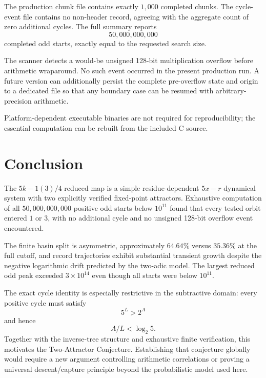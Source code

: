 \documentclass[11pt]{article}
\begin{document}
The production chunk file contains exactly $1,000$ completed chunks. The cycle-event file contains no non-header record, agreeing with the aggregate count of zero additional cycles. The full summary reports
\[
50,000,000,000
\]
completed odd starts, exactly equal to the requested search size.

The scanner detects a would-be unsigned 128-bit multiplication overflow before arithmetic wraparound. No such event occurred in the present production run. A future version can additionally persist the complete pre-overflow state and origin to a dedicated file so that any boundary case can be resumed with arbitrary-precision arithmetic.

Platform-dependent executable binaries are not required for reproducibility; the essential computation can be rebuilt from the included C source.

\section{Conclusion}

The $5k-1(3)/4$ reduced map is a simple residue-dependent $5x-r$ dynamical system with two explicitly verified fixed-point attractors. Exhaustive computation of all $50,000,000,000$ positive odd starts below $10^{11}$ found that every tested orbit entered $1$ or $3$, with no additional cycle and no unsigned 128-bit overflow event encountered.

The finite basin split is asymmetric, approximately $64.64\%$ versus $35.36\%$ at the full cutoff, and record trajectories exhibit substantial transient growth despite the negative logarithmic drift predicted by the two-adic model. The largest reduced odd peak exceeded $3\times10^{14}$ even though all starts were below $10^{11}$.

The exact cycle identity is especially restrictive in the subtractive domain: every positive cycle must satisfy
\[
5^L>2^A
\]
and hence
\[
A/L<\log_2 5.
\]
Together with the inverse-tree structure and exhaustive finite verification, this motivates the Two-Attractor Conjecture. Establishing that conjecture globally would require a new argument controlling arithmetic correlations or proving a universal descent/capture principle beyond the probabilistic model used here.
\end{document}
